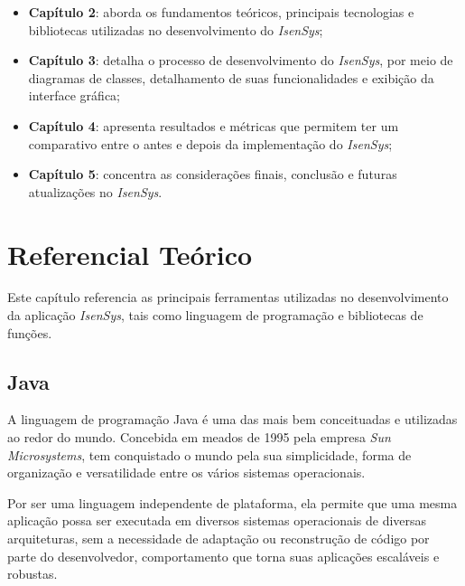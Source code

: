 \documentclass[
	12pt,			%
	openright,		%
	oneside,	
	a4paper,		%
	english,		%
	brazil			%
]{abntex2/abntex2}  %
\begin{document}
		\begin{itemize}
			
			\item \textbf{Capítulo 2}: aborda os fundamentos teóricos, principais tecnologias e bibliotecas utilizadas no desenvolvimento do \textit{IsenSys};
			\item \textbf{Capítulo 3}: detalha o processo de desenvolvimento do \textit{IsenSys}, por meio de diagramas de classes, detalhamento de suas funcionalidades e exibição da interface gráfica;
			\item \textbf{Capítulo 4}: apresenta resultados e métricas que permitem ter um comparativo entre o antes e depois da implementação do \textit{IsenSys};
			\item \textbf{Capítulo 5}: concentra as considerações finais, conclusão e futuras atualizações no \textit{IsenSys}.
			
		\end{itemize}

\chapter{Referencial Teórico}

	Este capítulo referencia as principais ferramentas utilizadas no desenvolvimento da aplicação \textit{IsenSys}, tais como linguagem de programação e bibliotecas de funções.
	
	\section{Java}
	
	A linguagem de programação Java \cite{java} é uma das mais bem conceituadas e utilizadas ao redor do mundo. Concebida em meados de 1995 pela empresa \textit{Sun Microsystems}, tem conquistado o mundo pela sua simplicidade, forma de organização e versatilidade entre os vários sistemas operacionais.
	
	Por ser uma linguagem independente de plataforma, ela permite que uma mesma aplicação possa ser executada em diversos sistemas operacionais de diversas arquiteturas, sem a necessidade de adaptação ou reconstrução de código por parte do desenvolvedor, comportamento que torna suas aplicações escaláveis e robustas.
	
\end{document}
